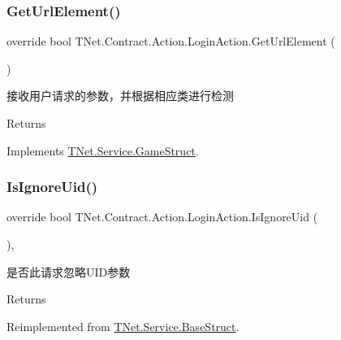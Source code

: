 \subsubsection{\texorpdfstring{Get\+Url\+Element()}{GetUrlElement()}}
{\footnotesize\ttfamily override bool T\+Net.\+Contract.\+Action.\+Login\+Action.\+Get\+Url\+Element (\begin{DoxyParamCaption}{ }\end{DoxyParamCaption})\hspace{0.3cm}{\ttfamily [virtual]}}



接收用户请求的参数，并根据相应类进行检测 

\begin{DoxyReturn}{Returns}

\end{DoxyReturn}


Implements \mbox{\hyperlink{class_t_net_1_1_service_1_1_game_struct_ad4167cb7ce62183a1336ebc30a848bfc}{T\+Net.\+Service.\+Game\+Struct}}.

\mbox{\label{class_t_net_1_1_contract_1_1_action_1_1_login_action_ad0ee65777c20af8acea8da0f24c977cf}} 
\subsubsection{\texorpdfstring{Is\+Ignore\+Uid()}{IsIgnoreUid()}}
{\footnotesize\ttfamily override bool T\+Net.\+Contract.\+Action.\+Login\+Action.\+Is\+Ignore\+Uid (\begin{DoxyParamCaption}{ }\end{DoxyParamCaption})\hspace{0.3cm}{\ttfamily [protected]}, {\ttfamily [virtual]}}



是否此请求忽略\+U\+I\+D参数 

\begin{DoxyReturn}{Returns}

\end{DoxyReturn}


Reimplemented from \mbox{\hyperlink{class_t_net_1_1_service_1_1_base_struct_ad113e67255dd3c3c625903fc746266b3}{T\+Net.\+Service.\+Base\+Struct}}.

